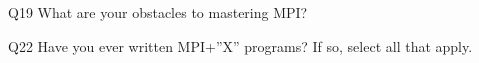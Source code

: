 \begin{description}%
\item{Q19} What are your obstacles to mastering MPI?%
\item{Q22} Have you ever written MPI+”X” programs? If so, select all that apply.%
\end{description}%
